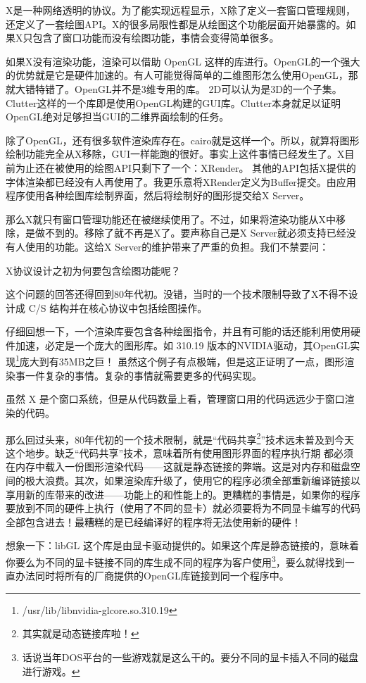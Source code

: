 X是一种网络透明的协议。为了能实现远程显示，X除了定义一套窗口管理规则，还定义了一套绘图API。X的很多局限性都是从绘图这个功能层面开始暴露的。如果X只包含了窗口功能而没有绘图功能，事情会变得简单很多。

如果X没有渲染功能，渲染可以借助 OpenGL 这样的库进行。OpenGL的一个强大的优势就是它是硬件加速的。有人可能觉得简单的二维图形怎么使用OpenGL，那就大错特错了。OpenGL并不是3维专用的库。
2D可以认为是3D的一个子集。Clutter这样的一个库即是使用OpenGL构建的GUI库。Clutter本身就足以证明OpenGL绝对足够担当GUI的二维界面绘制的任务。

除了OpenGL，还有很多软件渲染库存在。cairo就是这样一个。所以，就算将图形绘制功能完全从X移除，GUI一样能跑的很好。事实上这件事情已经发生了。X目前为止还在被使用的绘图API只剩下了一个：XRender。
其他的API包括X提供的字体渲染都已经没有人再使用了。我更乐意将XRender定义为Buffer提交。由应用程序使用各种绘图库绘制界面，然后将绘制好的图形提交给X Server。

那么X就只有窗口管理功能还在被继续使用了。不过，如果将渲染功能从X中移除，是做不到的。移除了就不再是X了。要声称自己是X Server就必须支持已经没有人使用的功能。这给X Server的维护带来了严重的负担。我们不禁要问：

\begin{center}
X协议设计之初为何要包含绘图功能呢？
\end{center}

这个问题的回答还得回到80年代初。没错，当时的一个技术限制导致了X不得不设计成 C/S 结构并在核心协议中包括绘图操作。

仔细回想一下，一个渲染库要包含各种绘图指令，并且有可能的话还能利用使用硬件加速，必定是一个庞大的图形库。如 310.19 版本的NVIDIA驱动，其OpenGL实现\footnote{/usr/lib/libnvidia-glcore.so.310.19}庞大到有35MB之巨！ 
虽然这个例子有点极端，但是这正证明了一点，图形渲染事一件复杂的事情。复杂的事情就需要更多的代码实现。

虽然 X 是个窗口系统，但是从代码数量上看，管理窗口用的代码远远少于窗口渲染的代码。

那么回过头来，80年代初的一个技术限制，就是“代码共享\footnote{其实就是动态链接库啦！}”技术远未普及到今天这个地步。缺乏“代码共享”技术，意味着所有使用图形界面的程序执行期
都必须在内存中载入一份图形渲染代码——这就是静态链接的弊端。这是对内存和磁盘空间的极大浪费。其次，如果渲染库升级了，使用它的程序必须全部重新编译链接以享用新的库带来的改进——功能上的和性能上的。更糟糕的事情是，如果你的程序要放到不同的硬件上执行（使用了不同的显卡）就必须要将为不同显卡编写的代码全部包含进去！最糟糕的是已经编译好的程序将无法使用新的硬件！

想象一下：libGL 这个库是由显卡驱动提供的。如果这个库是静态链接的，意味着你要么为不同的显卡链接不同的库生成不同的程序为客户使用\footnote{话说当年DOS平台的一些游戏就是这么干的。要分不同的显卡插入不同的磁盘进行游戏。}，要么就得找到一直办法同时将所有的厂商提供的OpenGL库链接到同一个程序中。


